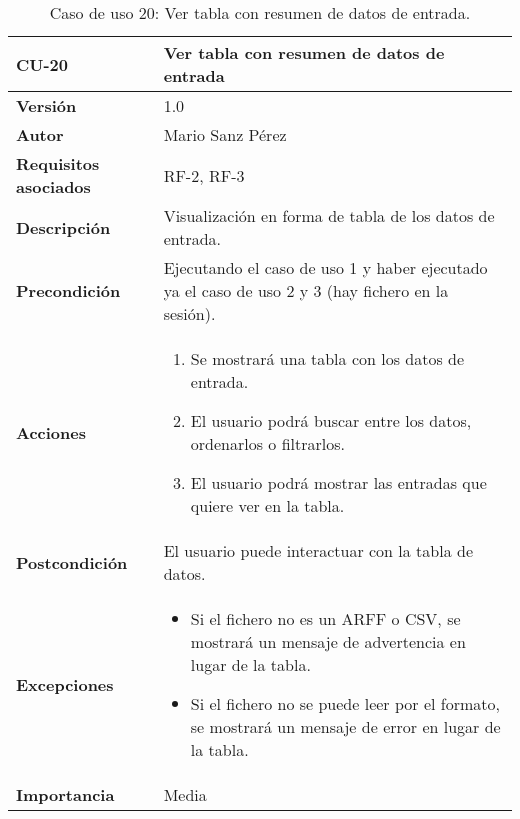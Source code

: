 \begin{table}[p]
	\centering
	\begin{tabularx}{\linewidth}{ p{} p{} }
		\toprule
		\textbf{CU-20}    & \textbf{Ver tabla con resumen de datos de entrada}\\
		\toprule
		\textbf{Versión}              & 1.0    \\
		\textbf{Autor}                & Mario Sanz Pérez \\
		\textbf{Requisitos asociados} & RF-2, RF-3 \\
		\textbf{Descripción}          & Visualización en forma de tabla de los datos de entrada. \\
		\textbf{Precondición}         & Ejecutando el caso de uso 1 y haber ejecutado ya el caso de uso 2 y 3 (hay fichero en la sesión). \\
		\textbf{Acciones}             &
		\begin{enumerate}
			\def\labelenumi{\arabic{enumi}.}
			\tightlist
			\item Se mostrará una tabla con los datos de entrada.
			\item El usuario podrá buscar entre los datos, ordenarlos o filtrarlos.
			\item El usuario podrá mostrar las entradas que quiere ver en la tabla.
		\end{enumerate}\\
		\textbf{Postcondición}        & El usuario puede interactuar con la tabla de datos. \\
		\textbf{Excepciones}          & \begin{itemize}
			\item Si el fichero no es un ARFF o CSV, se mostrará un mensaje de advertencia en lugar de la tabla.
			\item Si el fichero no se puede leer por el formato, se mostrará un mensaje de error en lugar de la tabla.
		\end{itemize} \\
		\textbf{Importancia}          & Media \\
		\bottomrule
	\end{tabularx}
	\caption{Caso de uso 20: Ver tabla con resumen de datos de entrada.}
\end{table}

